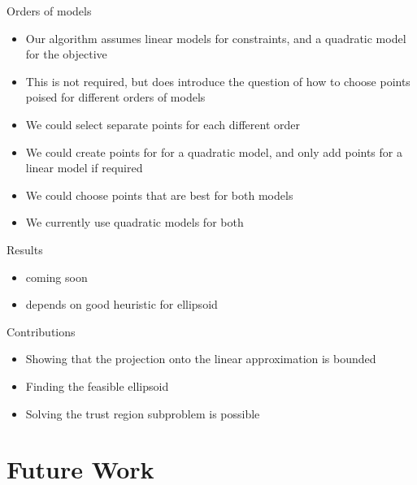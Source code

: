 \documentclass{beamer}
\begin{document}
\begin{frame}{Orders of models}
	\begin{itemize}
		\item Our algorithm assumes linear models for constraints, and a quadratic model for the objective
		\item This is not required, but does introduce the question of how to choose points poised for different orders of models
		\item We could select separate points for each different order
		\item We could create points for for a quadratic model, and only add points for a linear model if required
		\item We could choose points that are best for both models
		\item We currently use quadratic models for both
	\end{itemize}
\end{frame}



\begin{frame}{Results}
	\begin{itemize}
		\item coming soon
		\item depends on good heuristic for ellipsoid
	\end{itemize}
\end{frame}


\begin{frame}{Contributions}
	\begin{itemize}
		\item Showing that the projection onto the linear approximation is bounded
		\item Finding the feasible ellipsoid
		\item Solving the trust region subproblem is possible
	\end{itemize}
\end{frame}



\section{Future Work}


\end{document}

